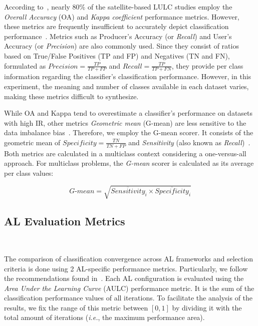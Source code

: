 \documentclass[preprint,12pt]{elsarticle}
\begin{document}
According to~\cite{Gavade2019}, nearly 80\% of the satellite-based LULC studies
employ the \textit{Overall Accuracy} (OA) and \textit{Kappa coefficient}
performance metrics. However, these metrics are frequently insufficient to
accurately depict classification performance~\cite{Olofsson2013, Pontius2011}.
Metrics such as Producer's Accuracy (or \textit{Recall}) and User's Accuracy
(or \textit{Precision}) are also commonly used. Since they consist of ratios
based on True/False Positives (TP and FP) and Negatives (TN and FN), formulated
as $Precision = \frac{TP}{TP+FP}$ and $Recall = \frac{TP}{TP+FN}$, they provide
per class information regarding the classifier's classification performance.
However, in this experiment, the meaning and number of classes available in
each dataset varies, making these metrics difficult to synthesize.

While OA and Kappa tend to overestimate a classifier's performance on datasets
with high IR, other metrics \textit{Geometric mean} (G-mean) are less
sensitive to the data imbalance bias~\cite{Jeni2013, Kubat1997}. Therefore, we
employ the G-mean scorer. It consists of the geometric mean of $Specificity =
\frac{TN}{TN + FP}$ and \textit{Sensitivity} (also known as
\textit{Recall})~\cite{Kubat1997}. Both metrics are calculated in a multiclass
context considering a one-versus-all approach. For multiclass problems, the
\textit{G-mean} scorer is calculated as its average per class values: 
        
\begin{equation*}
    \textit{G-mean} = \sqrt{\overline{Sensitivity}_i \times
    \overline{Specificity}_i}
\end{equation*}
    
\subsection{AL Evaluation Metrics}~\label{sec:al_evaluation_metrics}

The comparison of classification convergence across AL frameworks and
selection criteria is done using 2 AL-specific performance metrics.
Particularly, we follow the recommendations found in~\cite{Kottke2017}. Each
AL configuration is evaluated using the \textit{Area Under the Learning Curve}
(AULC) performance metric. It is the sum of the classification performance
values of all iterations. To facilitate the analysis of the results, we fix
the range of this metric between $[0,1]$ by dividing it with the total amount of
iterations (\textit{i.e.}, the maximum performance area). 
\end{document}
